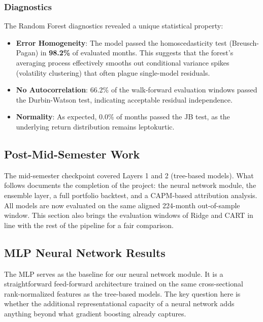 \documentclass[11pt]{article}
\begin{document}
\subsubsection{Diagnostics}
The Random Forest diagnostics revealed a unique statistical property:
\begin{itemize}
    \item \textbf{Error Homogeneity}: The model passed the homoscedasticity test (Breusch-Pagan) in \textbf{98.2\%} of evaluated months. This suggests that the forest's averaging process effectively smooths out conditional variance spikes (volatility clustering) that often plague single-model residuals.
    \item \textbf{No Autocorrelation}: 66.2\% of the walk-forward evaluation windows passed the Durbin-Watson test, indicating acceptable residual independence.
    \item \textbf{Normality}: As expected, 0.0\% of months passed the JB test, as the underlying return distribution remains leptokurtic.
\end{itemize}


\subsection{Post-Mid-Semester Work}

The mid-semester checkpoint covered Layers 1 and 2 (tree-based models). What follows documents the completion of the project: the neural network module, the ensemble layer, a full portfolio backtest, and a CAPM-based attribution analysis. All models are now evaluated on the same aligned 224-month out-of-sample window. This section also brings the evaluation windows of Ridge and CART in line with the rest of the pipeline for a fair comparison.

\subsection{MLP Neural Network Results}

The MLP serves as the baseline for our neural network module. It is a straightforward feed-forward architecture trained on the same cross-sectional rank-normalized features as the tree-based models. The key question here is whether the additional representational capacity of a neural network adds anything beyond what gradient boosting already captures.
\end{document}
